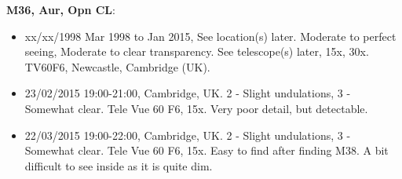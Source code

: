 {\bf M36, Aur, Opn CL}:
\begin{itemize}
\item xx/xx/1998 Mar 1998 to Jan 2015, See location(s) later. Moderate to perfect seeing, Moderate to clear transparency. See telescope(s) later, 15x, 30x. TV60F6, Newcastle, Cambridge (UK).
\item 23/02/2015 19:00-21:00, Cambridge, UK. 2 - Slight undulations, 3 - Somewhat clear. Tele Vue 60 F6, 15x. Very poor detail, but detectable. 
\item 22/03/2015 19:00-22:00, Cambridge, UK. 2 - Slight undulations, 3 - Somewhat clear. Tele Vue 60 F6, 15x. Easy to find after finding M38. A bit difficult to see inside as it is quite dim.
\end{itemize}
